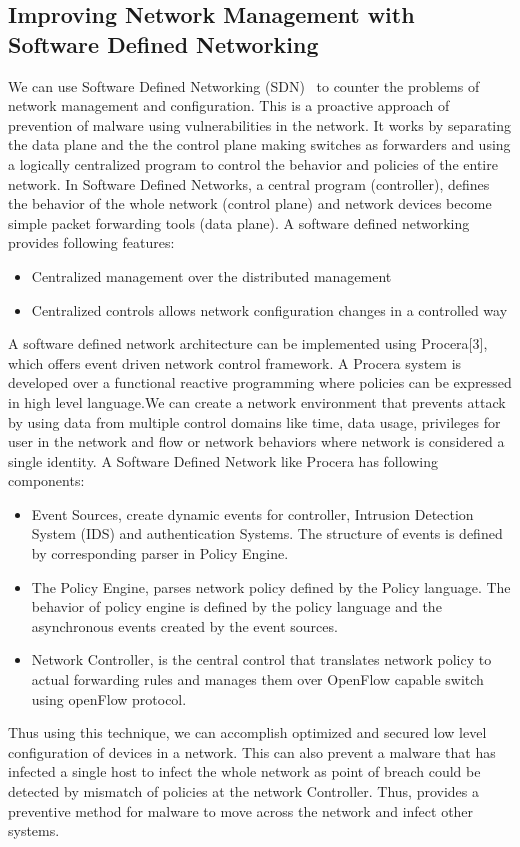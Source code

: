 \documentclass[11pt]{article}
\begin{document}
	\subsection{Improving Network Management with Software Defined Networking}
	We can use Software Defined Networking (SDN)~\cite{kim2013improving} to counter the problems of network management and configuration. This is a proactive approach of prevention of malware using vulnerabilities in the network. It works by separating the data plane and the the control plane making switches as forwarders and using a logically centralized program to control the behavior and policies of the entire network. In Software Defined Networks, a central program (controller), defines the behavior of the whole network (control plane) and network devices become simple packet forwarding tools (data plane).
	A software defined networking provides following features:
	\begin{itemize}
		\item Centralized management over the distributed management
		\item Centralized controls allows network configuration changes in a controlled way
	\end{itemize}
	 A software defined network architecture can be implemented using Procera[3], which offers event driven network control framework. A Procera system is developed over a functional reactive programming where policies can be expressed in high level language.We can create a network environment that prevents attack by using data from multiple control domains like time, data usage, privileges for user in the network and flow or network behaviors where network is considered a single identity. 
	 A Software Defined Network like Procera has following components:
	 \begin{itemize}
	 	\item Event Sources, create dynamic events for controller, Intrusion Detection System (IDS) and authentication Systems. The structure of events is defined by corresponding parser in Policy Engine.
		\item The Policy Engine, parses network policy defined by the Policy language. The behavior of policy engine is defined by the policy language and the asynchronous events created by the event sources.
		\item Network Controller, is the central control that translates network policy to actual forwarding rules and manages them over OpenFlow capable switch using openFlow protocol.
	 \end{itemize}
		Thus using this technique, we can accomplish optimized and secured low level configuration of devices in a network. This can also prevent a malware that has infected a single host to infect the whole network as point of breach could be detected by mismatch of policies at the network Controller. Thus, provides a preventive method for malware to move across the network and infect other systems.
	
\end{document}
